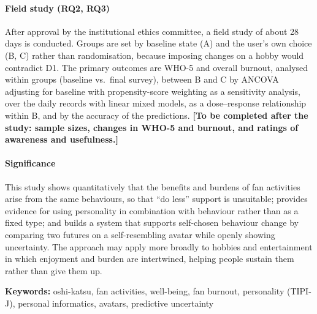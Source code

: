 \paragraph{Field study (RQ2, RQ3)}
After approval by the institutional ethics committee, a field study of about 28 days is conducted. Groups are set by baseline state (A) and the user's own choice (B, C) rather than randomisation, because imposing changes on a hobby would contradict D1. The primary outcomes are WHO-5 and overall burnout, analysed within groups (baseline vs.\ final survey), between B and C by ANCOVA adjusting for baseline with propensity-score weighting as a sensitivity analysis, over the daily records with linear mixed models, as a dose--response relationship within B, and by the accuracy of the predictions. \textbf{[To be completed after the study: sample sizes, changes in WHO-5 and burnout, and ratings of awareness and usefulness.]}

\paragraph{Significance}
This study shows quantitatively that the benefits and burdens of fan activities arise from the same behaviours, so that ``do less'' support is unsuitable; provides evidence for using personality in combination with behaviour rather than as a fixed type; and builds a system that supports self-chosen behaviour change by comparing two futures on a self-resembling avatar while openly showing uncertainty. The approach may apply more broadly to hobbies and entertainment in which enjoyment and burden are intertwined, helping people sustain them rather than give them up.

\vspace{1em}
\noindent\textbf{Keywords:} oshi-katsu, fan activities, well-being, fan burnout, personality (TIPI-J), personal informatics, avatars, predictive uncertainty

